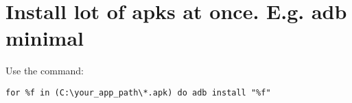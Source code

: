 \section{Install lot of apks at once. E.g. adb minimal}\label{sec:ch7}
Use the command:
\begin{verbatim}
for %f in (C:\your_app_path\*.apk) do adb install "%f"    
\end{verbatim}
